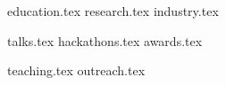 \documentclass[letterpaper,11pt]{article}
\begin{document}


{education.tex}
{research.tex}
{industry.tex}

\pagebreak


\begin{minipage}[t]{0.47\textwidth}
{{talks.tex}}
{{hackathons.tex}}
{{awards.tex}}
\end{minipage} \hspace{0.04\textwidth} \begin{minipage}[t]{0.46\textwidth}
{ {teaching.tex}}
{{outreach.tex}}
\end{minipage}
\end{document}

